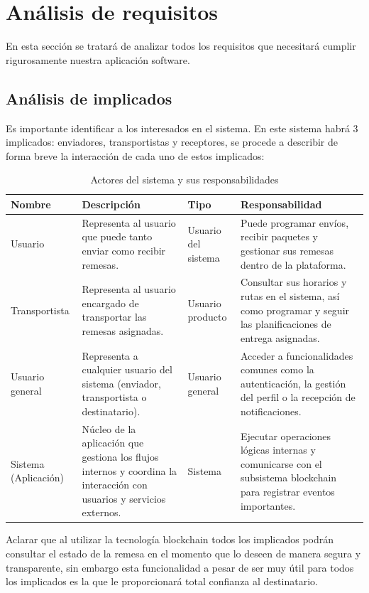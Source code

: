 \raggedbottom
\chapter{Análisis de requisitos}
En esta sección se tratará de analizar todos los requisitos que necesitará cumplir rigurosamente nuestra aplicación software.
\section{Análisis de implicados}
Es importante identificar a los interesados en el sistema. En este sistema habrá 3 implicados: enviadores, transportistas y receptores, se procede a describir de forma breve la interacción de cada uno de estos implicados:


\begin{table}[H]
    \centering
    \small
    \begin{tabularx}{\textwidth}{|p{2.5cm}|X|p{2.5cm}|X|}
        \hline
        \textbf{Nombre} & \textbf{Descripción} & \textbf{Tipo} & \textbf{Responsabilidad} \\ \hline
        Usuario & Representa al usuario que puede tanto enviar como recibir remesas. & Usuario del sistema & Puede programar envíos, recibir paquetes y gestionar sus remesas dentro de la plataforma. \\ \hline
        Transportista & Representa al usuario encargado de transportar las remesas asignadas. & Usuario producto & Consultar sus horarios y rutas en el sistema, así como programar y seguir las planificaciones de entrega asignadas. \\ \hline
        Usuario general & Representa a cualquier usuario del sistema (enviador, transportista o destinatario). & Usuario general & Acceder a funcionalidades comunes como la autenticación, la gestión del perfil o la recepción de notificaciones. \\ \hline
        Sistema (Aplicación) & Núcleo de la aplicación que gestiona los flujos internos y coordina la interacción con usuarios y servicios externos. & Sistema & Ejecutar operaciones lógicas internas y comunicarse con el subsistema blockchain para registrar eventos importantes. \\ \hline
    \end{tabularx}
    \caption{Actores del sistema y sus responsabilidades}
    \normalsize
\end{table}



Aclarar que al utilizar la tecnología blockchain todos los implicados podrán consultar el estado de la remesa en el momento que lo deseen de manera segura y transparente, sin embargo esta funcionalidad a pesar de ser muy útil para todos los implicados es la que le proporcionará total confianza al destinatario.

